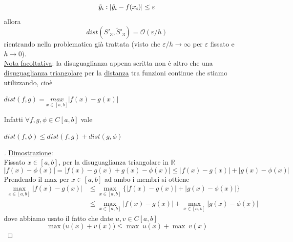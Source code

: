 \[
\tilde{y}_i : \lvert\tilde{y}_i - f(x_i)\rvert \le \varepsilon
\]
allora
\[
dist(S'_3, \tilde{S}'_3) = \mathcal{O}(\varepsilon/h)
\]
rientrando nella problematica già trattata (visto che $\varepsilon/h \to \infty$ per $\varepsilon$ fissato e $h \to 0$).\\
\uline{Nota facoltativa}: la disuguaglianza appena scritta non è altro che una \uline{disuguaglianza triangolare} per la \uline{distanza} tra funzioni continue che stiamo utilizzando, cioè \\
\begin{center}
$dist(f,g) = \underset{x \in [a,b]}{max} |f(x)-g(x)|$\\
\end{center}
Infatti $\forall f,g,\phi \in C[a,b]$ vale \\
\begin{center}
$dist(f,\phi)\leq dist(f,g) + dist(g,\phi)$\\
\end{center}

\begin{proof}[\unskip\nopunct]
\uline{Dimostrazione}:\\
Fissato $x\in [a,b]$, per la disuguaglianza triangolare in $\mathbb{R}$
\[
| f(x) - \phi(x) | = | f(x) - g(x) + g(x) - \phi(x) | \leq | f(x) - g(x) | + | g(x) - \phi(x) |
\]
Prendendo il max per $x \in [a,b]$ ad ambo i membri si ottiene
\[ \begin{split}
\underset{x \in [a,b]}{\max} |f(x)-g(x)| & \leq \underset{x \in [a,b]}{\max} \{ |f(x)-g(x)| + |g(x)-\phi(x)| \} \\
& \leq \underset{x \in [a,b]}{\max} |f(x)-g(x)|+ \underset{x \in [a,b]}{\max} |g(x)-\phi(x)|
\end{split} \]
dove abbiamo usato il fatto che date $u,v \in C[a,b]$
\[
\max\Big( u(x)+v(x) \Big) \leq \max \ u(x) + \max \ v(x)
\]
\end{proof}
\newpage